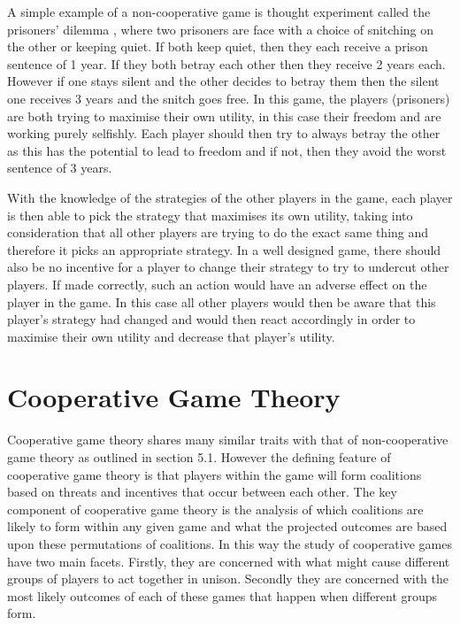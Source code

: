\documentclass[a4paper, notitlepage]{report}
\begin{document}
A simple example of a non-cooperative game is thought experiment called the
prisoners' dilemma \cite{poundstone1993prisoner}, where two prisoners are face
with a choice of snitching on the other or keeping quiet. If both keep quiet,
then they each receive a prison sentence of 1 year. If they both betray each other
then they receive 2 years each. However if one stays silent and the other
decides to betray them then the silent one receives 3 years and the snitch goes
free. In this game, the players (prisoners) are both trying to maximise their
own utility, in this case their freedom and are working purely selfishly. Each
player should then try to always betray the other as this has the potential to
lead to freedom and if not, then they avoid the worst sentence of 3 years. 

With the knowledge of the strategies of the other players in the game, each
player is then able to pick the strategy that maximises its own utility, taking
into consideration that all other players are trying to do the exact same thing
and therefore it picks an appropriate strategy. In a well designed game, there
should also be no incentive for a player to change their strategy to try to
undercut other players. If made correctly, such an action would have an adverse
effect on the player in the game. In this case all other players would then be
aware that this player’s strategy had changed and would then react accordingly
in order to maximise their own utility and decrease that player’s utility.
\section{Cooperative Game Theory}
\label{sec:orgd7bb913}
Cooperative game theory shares many similar traits with that of non-cooperative
game theory as outlined in section 5.1. However the defining feature of
cooperative game theory is that players within the game will form coalitions
based on threats and incentives that occur between each other. The key component
of cooperative game theory is the analysis of which coalitions are likely to
form within any given game and what the projected outcomes are based upon these
permutations of coalitions. In this way the study of cooperative games have two
main facets. Firstly, they are concerned with what might cause different groups
of players to act together in unison. Secondly they are concerned with the most
likely outcomes of each of these games that happen when different groups form.
\end{document}
